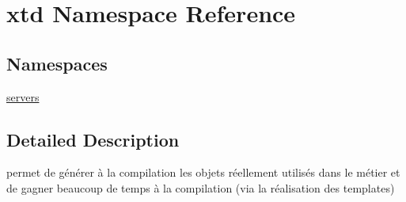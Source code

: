 \hypertarget{namespacextd}{}\section{xtd Namespace Reference}
\label{namespacextd}
\subsection*{Namespaces}
\begin{DoxyCompactItemize}
\item 
 \hyperlink{namespacextd_1_1servers}{servers}
\end{DoxyCompactItemize}


\subsection{Detailed Description}
permet de générer à la compilation les objets réellement utilisés dans le métier et de gagner beaucoup de temps à la compilation (via la réalisation des templates) 